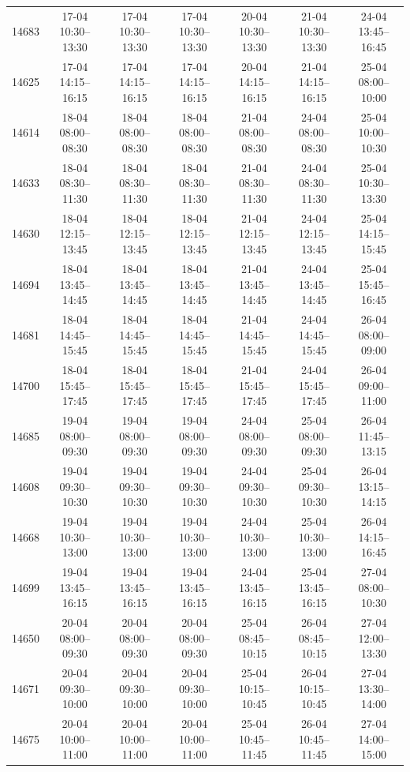 \begin{table}[htbp]
\begin{tabular}{|r|c|c|c|c|c|c|}
14683 & 17-04 10:30--13:30 & 17-04 10:30--13:30 & 17-04 10:30--13:30 & 20-04 10:30--13:30 & 21-04 10:30--13:30 & 24-04 13:45--16:45 \\ 
14625 & 17-04 14:15--16:15 & 17-04 14:15--16:15 & 17-04 14:15--16:15 & 20-04 14:15--16:15 & 21-04 14:15--16:15 & 25-04 08:00--10:00 \\ 
14614 & 18-04 08:00--08:30 & 18-04 08:00--08:30 & 18-04 08:00--08:30 & 21-04 08:00--08:30 & 24-04 08:00--08:30 & 25-04 10:00--10:30 \\ 
14633 & 18-04 08:30--11:30 & 18-04 08:30--11:30 & 18-04 08:30--11:30 & 21-04 08:30--11:30 & 24-04 08:30--11:30 & 25-04 10:30--13:30 \\ 
14630 & 18-04 12:15--13:45 & 18-04 12:15--13:45 & 18-04 12:15--13:45 & 21-04 12:15--13:45 & 24-04 12:15--13:45 & 25-04 14:15--15:45 \\ 
14694 & 18-04 13:45--14:45 & 18-04 13:45--14:45 & 18-04 13:45--14:45 & 21-04 13:45--14:45 & 24-04 13:45--14:45 & 25-04 15:45--16:45 \\ 
14681 & 18-04 14:45--15:45 & 18-04 14:45--15:45 & 18-04 14:45--15:45 & 21-04 14:45--15:45 & 24-04 14:45--15:45 & 26-04 08:00--09:00 \\ 
14700 & 18-04 15:45--17:45 & 18-04 15:45--17:45 & 18-04 15:45--17:45 & 21-04 15:45--17:45 & 24-04 15:45--17:45 & 26-04 09:00--11:00 \\ 
14685 & 19-04 08:00--09:30 & 19-04 08:00--09:30 & 19-04 08:00--09:30 & 24-04 08:00--09:30 & 25-04 08:00--09:30 & 26-04 11:45--13:15 \\ 
14608 & 19-04 09:30--10:30 & 19-04 09:30--10:30 & 19-04 09:30--10:30 & 24-04 09:30--10:30 & 25-04 09:30--10:30 & 26-04 13:15--14:15 \\ 
14668 & 19-04 10:30--13:00 & 19-04 10:30--13:00 & 19-04 10:30--13:00 & 24-04 10:30--13:00 & 25-04 10:30--13:00 & 26-04 14:15--16:45 \\ 
14699 & 19-04 13:45--16:15 & 19-04 13:45--16:15 & 19-04 13:45--16:15 & 24-04 13:45--16:15 & 25-04 13:45--16:15 & 27-04 08:00--10:30 \\ 
14650 & 20-04 08:00--09:30 & 20-04 08:00--09:30 & 20-04 08:00--09:30 & 25-04 08:45--10:15 & 26-04 08:45--10:15 & 27-04 12:00--13:30 \\ 
14671 & 20-04 09:30--10:00 & 20-04 09:30--10:00 & 20-04 09:30--10:00 & 25-04 10:15--10:45 & 26-04 10:15--10:45 & 27-04 13:30--14:00 \\ 
14675 & 20-04 10:00--11:00 & 20-04 10:00--11:00 & 20-04 10:00--11:00 & 25-04 10:45--11:45 & 26-04 10:45--11:45 & 27-04 14:00--15:00 \\ 

\end{tabular}
\end{table}
